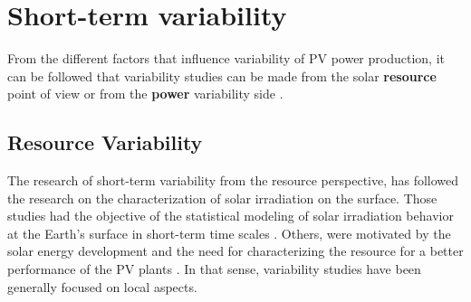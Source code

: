 \section{Short-term variability}%


From the different factors that influence variability of PV power production, it can be followed that variability studies can be made from the solar \textbf{resource} point of view or from the \textbf{power} variability side \cite*{Widen2015}.

\subsection{Resource Variability}


The research of short-term variability from the resource perspective, has followed the research on the characterization of solar irradiation on the surface. Those studies had the objective of the statistical modeling of solar irradiation behavior at the Earth's surface in short-term time scales \cite*{Liu1960}. Others, were motivated by the solar energy development and the need for characterizing the resource for a better performance of the PV plants \cite*{Collares-Pereira1979}. In that sense, variability studies have been generally focused on local aspects.

